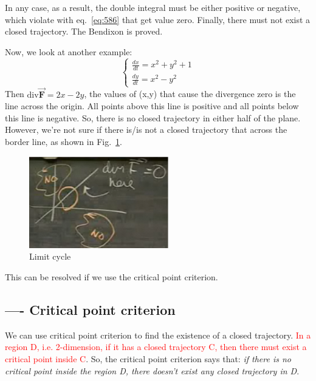 In any case, as a result, the double integral must be either positive
or negative, which violate with eq.~\eqref{eq:586} that get value
zero. Finally, there must not exist a closed trajectory. The Bendixon
is proved. 

Now, we look at another example:
\begin{equation}
  \label{eq:588}
  \left\{
    \begin{array}{cc}
      \frac{dx}{dt} = x^2 + y^2 + 1\\
      \frac{dy}{dt} = x^2-y^2
    \end{array}
  \right.
\end{equation}
Then $\text{div}\overrightarrow{\mathbf{F}} = 2x - 2y$, the values of
(x,y) that cause the divergence zero is the line across the
origin. All points above this line is positive and all points below
this line is negative. So, there is no closed trajectory in either
half of the plane. However, we're not sure if there is/is not a closed
trajectory that across the border line, as shown in
Fig.~\ref{fig:limit_cycle_4}.

\begin{figure}[hbt]
  \centerline{\includegraphics[height=4cm,
    angle=0]{./images/limit_cycle_4.eps}}
  \caption{Limit cycle}
  \label{fig:limit_cycle_4}
\end{figure}

This can be resolved if we use the critical point criterion. 

\subsection{---- Critical point criterion}
\label{sec:crit-point-crit}

We can use critical point criterion to find the existence of a closed
trajectory.
\textcolor{red}{In a region D, i.e. 2-dimension, if it has a closed
  trajectory C, then there must exist a critical point inside C}.
So, the critical point criterion says that:
{\it if there is no critical point inside the region D, there doesn't
  exist any closed trajectory in D}.

